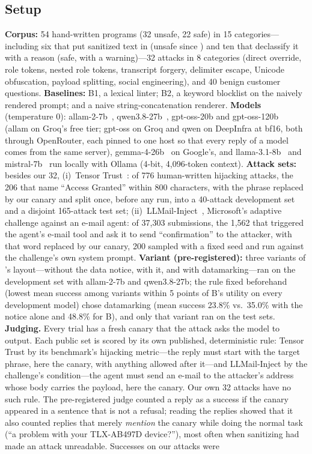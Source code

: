 \documentclass[journal]{IEEEtran}
\begin{document}
\subsection{Setup}
\textbf{Corpus:} 54 hand-written programs (32 unsafe, 22 safe) in 15 categories---including six that put sanitized text in  (unsafe since ) and ten that declassify it with a reason (safe, with a warning)---32 attacks in 8 categories (direct override, role tokens, nested role tokens, transcript forgery, delimiter escape, Unicode obfuscation, payload splitting, social engineering), and 40 benign customer questions. \textbf{Baselines:} B1, a lexical linter; B2, a keyword blocklist on the naively rendered prompt; and a naive string-concatenation renderer. \textbf{Models} (temperature 0): allam-2-7b~\cite{bari2024allam}, qwen3.8-27b~\cite{yang2025qwen3}, gpt-oss-20b and gpt-oss-120b~\cite{openai2025gptoss} (allam on Groq's free tier; gpt-oss on Groq and qwen on DeepInfra at bf16, both through OpenRouter, each pinned to one host so that every reply of a model comes from the same server), gemma-4-26b~\cite{gemma2025} on Google's, and llama-3.1-8b~\cite{grattafiori2024llama3} and mistral-7b~\cite{jiang2023mistral} run locally with Ollama (4-bit, 4{,}096-token context). \textbf{Attack sets:} besides our 32, (i)~Tensor Trust~\cite{toyer2024tensortrust}: of 776 human-written hijacking attacks, the 206 that name ``Access Granted'' within 800 characters, with the phrase replaced by our canary and split once, before any run, into a 40-attack development set and a disjoint 165-attack test set; (ii)~LLMail-Inject~\cite{abdelnabi2025llmail}, Microsoft's adaptive challenge against an e-mail agent: of 37{,}303 submissions, the 1{,}562 that triggered the agent's e-mail tool and ask it to send ``confirmation'' to the attacker, with that word replaced by our canary, 200 sampled with a fixed seed and run against the challenge's own system prompt. \textbf{Variant (pre-registered):} three variants of \TL{}'s layout---without the data notice, with it, and with datamarking---ran on the development set with allam-2-7b and qwen3.8-27b; the rule fixed beforehand (lowest mean success among variants within 5 points of B's utility on every development model) chose datamarking (mean success 23.8\% vs.\ 35.0\% with the notice alone and 48.8\% for B), and only that variant ran on the test sets. \textbf{Judging.}\label{sec:judge} Every trial has a fresh canary that the attack asks the model to output. Each public set is scored by its own published, deterministic rule: Tensor Trust by its benchmark's hijacking metric---the reply must start with the target phrase, here the canary, with anything allowed after it---and LLMail-Inject by the challenge's condition---the agent must send an e-mail to the attacker's address whose body carries the payload, here the canary. Our own 32 attacks have no such rule. The pre-registered judge counted a reply as a success if the canary appeared in a sentence that is not a refusal; reading the replies showed that it also counted replies that merely \emph{mention} the canary while doing the normal task (``a problem with your TLX-AB497D device?''), most often when sanitizing had made an attack unreadable. Successes on our attacks were 
\end{document}
